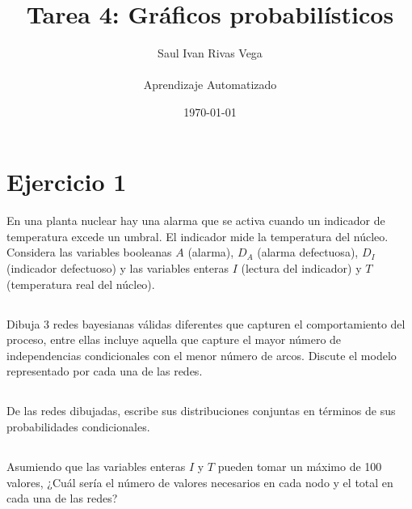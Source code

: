 \documentclass[12pt]{article}
\title{Tarea 4: Gráficos probabilísticos}
\author{
	Saul Ivan Rivas Vega \\
	\\
	Aprendizaje Automatizado\\
}
\date{\today}
\begin{document}
	\maketitle
	\pagebreak
	\section{Ejercicio 1}
	  \paragraph{} En una planta nuclear hay una alarma que se activa cuando un indicador de temperatura excede un umbral. El indicador mide la temperatura del núcleo. Considera las variables booleanas $A$ (alarma), $D_A$ (alarma defectuosa), $D_I$ (indicador defectuoso) y las variables enteras $I$ (lectura del indicador) y $T$ (temperatura real del núcleo).\\
	  \subsection{}
	  Dibuja 3 redes bayesianas válidas diferentes que capturen el comportamiento del proceso, entre ellas incluye aquella que capture el mayor número de independencias condicionales con el menor número de arcos. Discute el modelo representado por cada una de las redes.
	  \subsection{}
	  De las redes dibujadas, escribe sus distribuciones conjuntas en términos de sus probabilidades condicionales.
	  \subsection{}Asumiendo que las variables enteras $I$ y $T$ pueden tomar un máximo de 100 valores, ¿Cuál sería el número de valores necesarios en cada nodo y el total en cada una de las redes?
\end{document}
